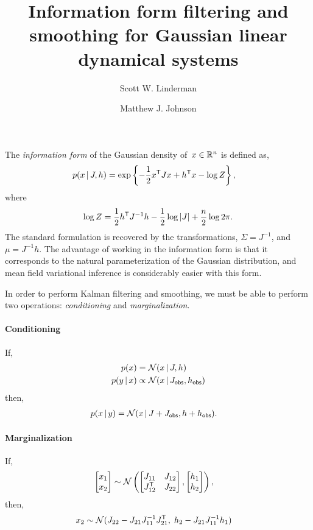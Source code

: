 \documentclass{article}
\title{Information form filtering and smoothing for Gaussian linear dynamical systems}
\author{Scott W. Linderman 
  \and
  Matthew J. Johnson 
}
\begin{document}
\singlespacing
\maketitle
\onehalfspacing

The \emph{information form} of the Gaussian density of~$x \in \mathbb{R}^n$ is defined as,
\begin{align}
  p(x \,|\, J, h) 
  &=  \exp \left \{ -\frac{1}{2} x^{\mathsf{T}} J x + h^{\mathsf{T}} x - \log Z \right \},
\end{align}
where
\begin{align}
  \log Z = \frac{1}{2} h^{\mathsf{T}} J^{-1} h - \frac{1}{2}\log |J| +\frac{n}{2} \log 2\pi.
\end{align}
The standard formulation is recovered by the transformations,  $\Sigma = J^{-1}$, and
$\mu = J^{-1} h$. The advantage of working in the information form is that 
it corresponds to the natural parameterization of the Gaussian distribution, and
mean field variational inference is considerably easier with this form.

In order to perform Kalman filtering and smoothing, we must be able to perform
two operations: \emph{conditioning} and \emph{marginalization}. 

\paragraph{Conditioning}
If,
\begin{align}
  p(x) &= \mathcal{N}(x \,|\, J, h) \\
  p(y \,|\, x) &\propto \mathcal{N}(x \,|\, J_{\sf obs}, h_{\sf obs}) 
\end{align}
then,
\begin{align}
  p(x \,|\, y) &= \mathcal{N}(x \,|\, J + J_{\sf obs}, h + h_{\sf obs}).
\end{align}

\paragraph{Marginalization}
If,
\begin{align}
  \begin{bmatrix} x_1 \\ x_2  \end{bmatrix}
  &\sim
  \mathcal{N} \left(
  \begin{bmatrix} 
    J_{11}        & J_{12} \\
    J_{12}^{\mathsf{T}} & J_{22} 
  \end{bmatrix},
  \begin{bmatrix} h_1 \\ h_2 \end{bmatrix}
  \right),
\end{align}
then,
\begin{align}
  x_2 &\sim \mathcal{N}(
        J_{22} - J_{21}J_{11}^{-1} J_{21}^{\mathsf{T}}, \;
        h_2 - J_{21} J_{11}^{-1} h_1)
\end{align}
\end{document}

